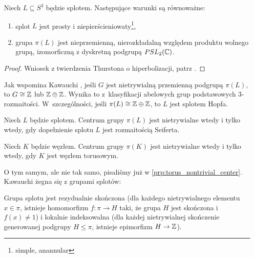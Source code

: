 \begin{proposition}
    Niech $L \subseteq S^3$ będzie splotem.
    Następujące warunki są równoważne:
    \begin{enumerate}
        \item splot $L$ jest prosty i niepierścieniowaty\footnote{simple, anannular},
        \item grupa $\pi(L)$ jest nieprzemienną, nierozkładalną względem produktu wolnego grupą, izomorficzną z dyskretną podgrupą $PSL_2(\mathbb C)$.
    \end{enumerate}
\end{proposition}

\begin{proof}
    Wniosek z twierdzenia Thurstona o hiperbolizacji, patrz \cite[s. 76]{kawauchi1996}.
\end{proof}

Jak wspomina Kawauchi \cite[s. 83]{kawauchi1996}, jeśli $G$ jest nietrywialną przemienną podgrupą $\pi(L)$, to $G \cong \mathbb Z$ lub $\mathbb Z \oplus \mathbb Z$.
Wynika to z~klasyfikacji abelowych grup podstawowych 3-rozmaitości.
W~szczególności, jeśli $\pi(L) \cong \mathbb Z \oplus \mathbb Z$, to $L$ jest splotem Hopfa.

\begin{proposition}
    Niech $L$ będzie splotem.
    Centrum grupy $\pi(L)$ jest nietrywialne wtedy i tylko wtedy, gdy dopełnienie splotu $L$ jest rozmaitością Seiferta.
\end{proposition}

\begin{corollary}
    Niech $K$ będzie węzłem.
    Centrum grupy $\pi(K)$ jest nietrywialne wtedy i tylko wtedy, gdy $K$ jest węzłem torusowym.
\end{corollary}

O tym samym, ale nie tak samo, pisaliśmy już w \ref{prp:torus_nontrivial_center}.
Kawauchi \cite[s. 85]{kawauchi1996} żegna się z grupami splotów:

\begin{proposition}
    Grupa splotu jest rezydualnie skończona (dla każdego nietrywialnego elementu $x \in \pi$, istnieje homomorfizm $f: \pi \to H$ taki, że grupa $H$ jest skończona i $f(x) \neq 1$) i lokalnie indeksowalna (dla każdej  nietrywialnej skończenie generowanej podgrupy $H \le \pi$, istnieje epimorfizm $H \to \mathbb Z$).
\end{proposition}




